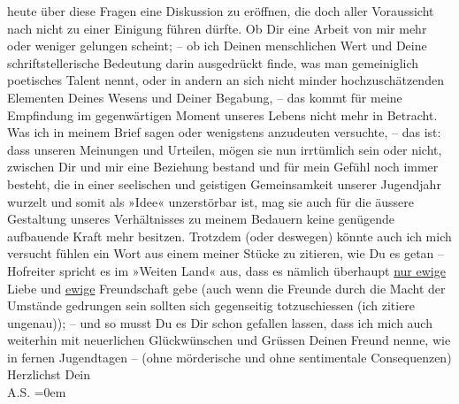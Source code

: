 \begin{ledgroupsized}[t]{13cm}
                  heute über diese Fragen eine Diskussion zu
               eröffnen, die doch aller Voraussicht nach nicht zu einer Einigung führen dürfte.\pend
           \pstart
           Ob Dir eine Arbeit von mir mehr oder weniger gelungen scheint; – ob ich Deinen
               menschlichen Wert und Deine schriftstellerische Bedeutung darin ausgedrückt finde,
               was man gemeiniglich poetisches Talent nennt, oder in andern an sich nicht minder
               hochzuschätzenden Elementen Deines Wesens und Deiner Begabung, – das kommt für meine
               Empfindung im gegenwärtigen Moment unseres Lebens nicht mehr in Betracht.\pend
           \pstart
           Was ich in meinem Brief sagen oder wenigstens anzudeuten versuchte, – das ist: dass
                   unseren Meinungen und Urteilen, mögen sie nun
               irrtümlich sein oder nicht, zwischen Dir und mir eine Beziehung bestand und für mein
               Gefühl noch immer besteht, die in einer seelischen und geistigen Gemeinsamkeit
               unserer Jugendjahr wurzelt und somit als »Idee« unzerstörbar ist, mag sie auch {\pb}für die äussere Gestaltung unseres Verhältnisses zu
               meinem Bedauern keine genügende aufbauende Kraft mehr besitzen.\pend
           \pstart
           Trotzdem (oder deswegen) könnte auch ich mich versucht fühlen ein Wort aus einem
               meiner Stücke zu zitieren, wie Du es getan – Hofreiter spricht es im »Weiten Land« aus, dass es nämlich überhaupt \uline{nur
                  ewige} Liebe und \uline{ewige} Freundschaft gebe (auch
               wenn die Freunde durch die Macht der Umstände gedrungen sein sollten sich gegenseitig
               totzuschiessen (ich zitiere ungenau)); – und so musst Du es Dir schon gefallen
               lassen, dass ich mich auch weiterhin mit neuerlichen Glückwünschen und Grüssen Deinen
               Freund nenne, wie in fernen Jugendtagen – (ohne mörderische und ohne sentimentale
               Consequenzen)\pend
           \pstart
           Herzlichst Dein {\\[\baselineskip]}\spacefill\mbox{A.S.}\pend
           \leftskip=0em{}
         
         \endnumbering{}\end{ledgroupsized}\begin{anhang}\end{anhang}\newcommand{\dateiname}{L03519}\newcommand{\titel}{Arthur Schnitzler an Paul Goldmann, 9. 3. 1925}\newcommand{\editorInnen}{Martin Anton Müller und Laura Untner}
      